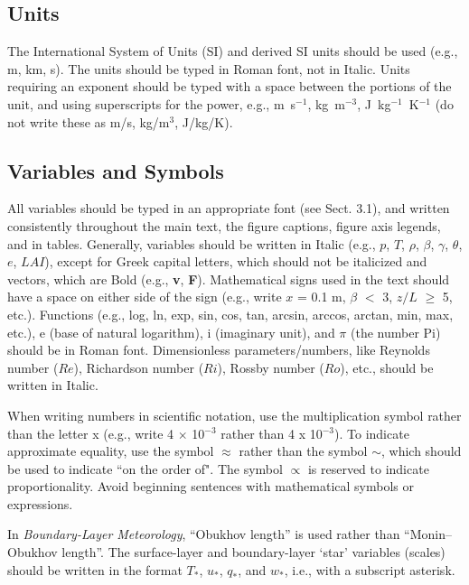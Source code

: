 \subsection{Units}
The International System of Units (SI) and derived SI units should be used (e.g., m, km, s). The units should be typed in Roman font, not in Italic. Units requiring an exponent should be typed with a space between the portions of the unit, and using superscripts for the power, e.g., m~s$^{-1}$, kg~m$^{-3}$, J~kg$^{-1}$~K$^{-1}$ (do not write these as m/s, kg/m$^3$, J/kg/K).

\subsection{Variables and Symbols}
All variables should be typed in an appropriate font (see Sect. 3.1), and written consistently throughout the main text, the figure captions, figure axis legends, and in tables. Generally, variables should be written in Italic (e.g., $p$, $T$, $\rho$, $\beta$, $\gamma$, $\theta$, $e$, $LAI$), except for Greek capital letters, which should not be italicized and vectors, which are Bold (e.g., \textbf{v}, \textbf{F}). Mathematical signs used in the text should have a space on either side of the sign (e.g., write $x$ = 0.1 m, $\beta$ $<$ 3, $z/L$ $\geq$ 5, etc.). Functions (e.g., log, ln, exp, sin, cos, tan, arcsin, arccos, arctan, min, max, etc.), e (base of natural logarithm), i (imaginary unit), and $\pi$ (the number Pi) should be in Roman font. Dimensionless parameters/numbers, like Reynolds number ($Re$), Richardson number ($Ri$), Rossby number ($Ro$), etc., should be written in Italic.

When writing numbers in scientific notation, use the multiplication symbol rather than the letter x (e.g., write 4 $\times$ 10$^{-3}$ rather than 4 x 10$^{-3}$). To indicate approximate equality, use the symbol $\approx$ rather than the symbol $\sim$, which should be used to indicate ``on the order of". The symbol $\propto$ is reserved to indicate proportionality. Avoid beginning sentences with mathematical symbols or expressions.

In \textit{Boundary-Layer Meteorology}, ``Obukhov length'' is used rather than ``Monin--Obukhov length''. The surface-layer and boundary-layer `star' variables (scales) should be written in the format $T_*$, $u_*$, $q_*$, and $w_*$, i.e., with a subscript asterisk.

